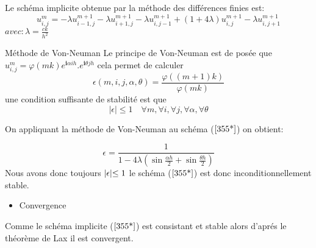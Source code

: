\documentclass[12pt]{beamer}
\begin{document}
\begin{frame}
		Le sch\'{e}ma implicite obtenue par la m\'{e}thode des différences finies est:
		\begin{equation}u^{m}_{i,j}=-\lambda u^{m+1}_{i-1,j}-\lambda u^{m+1}_{i+1,j}-\lambda u^{m+1}_{i,j-1}+(1+4\lambda)u^{m+1}_{i,j}-\lambda u^{m+1}_{i,j+1}\label{355*}\end{equation}$avec: \lambda=\frac{ck}{h^{2}}$\\
		\begin{block}{M\'{e}thode de Von-Neuman}
		Le principe de Von-Neuman est de pos\'{e}e que $	u^{m}_{i,j}=\varphi(mk)e^{\mathbf{i}\alpha ih}.e^{\mathbf{i}\theta jh}$ cela permet de calculer 
		\begin{equation}
		\epsilon(m,i,j,\alpha,\theta)=\dfrac{\varphi((m+1)k)}{\varphi(mk)}
		\end{equation}  
		une condition suffisante de stabilit\'{e} est que \begin{equation}
		\mid\epsilon\mid\leq 1\quad\forall m,\forall i,\forall j,\forall\alpha ,\forall \theta
		\end{equation}
		\end{block}
	\end{frame}

\begin{frame}
	On appliquant la m\'{e}thode de Von-Neuman
	au sch\'{e}ma ($\ref{355*}$) on obtient:

	\begin{equation}\epsilon=\frac{1}{1-4\lambda(\sin \frac{\alpha h}{2}+\sin\frac{\theta h}{2})}\end{equation}
	Nous avons donc toujours $\arrowvert \epsilon\lvert\leq1$  le sch\'{e}ma ($\ref{355*}$) est donc inconditionnellement stable.
	\begin{itemize}
		[triangle]
		\item Convergence
	\end{itemize}
	\begin{block}{}

Comme le sch\'{e}ma implicite ($\ref{355*}$) est consistant et stable alors d'apr\'{e}s le th\'{e}or\`{e}me de Lax il est convergent.

		
	\end{block}
	\end{frame}
\end{document}
